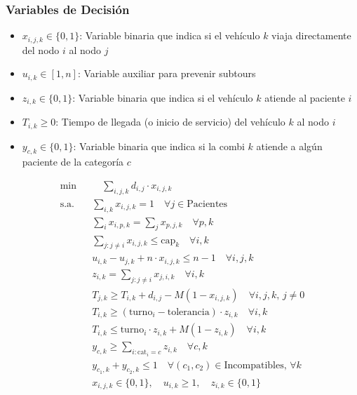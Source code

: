 \documentclass[12pt]{article}
\begin{document}
\subsubsection*{Variables de Decisión}

\begin{itemize}
    \item $x_{i,j,k} \in \{0,1\}$: Variable binaria que indica si el vehículo $k$ viaja directamente del nodo $i$ al nodo $j$
    \item $u_{i,k} \in [1,n]$: Variable auxiliar para prevenir subtours
    \item $z_{i,k} \in \{0,1\}$: Variable binaria que indica si el vehículo $k$ atiende al paciente $i$
    \item $T_{i,k} \geq 0$: Tiempo de llegada (o inicio de servicio) del vehículo $k$ al nodo $i$
    \item $y_{c,k} \in \{0,1\}$: Variable binaria que indica si la combi $k$ atiende a algún paciente de la categoría $c$
\end{itemize}

\begin{align*}
  \min & \quad \sum_{i,j,k} d_{i,j} \cdot x_{i,j,k} \\
  \text{s.a.} \quad
    & \sum_{i,k} x_{i,j,k} = 1 \quad \forall j \in \text{Pacientes} \\
    & \sum_{i} x_{i,p,k} = \sum_{j} x_{p,j,k} \quad \forall p, k \\
    & \sum_{j: j \ne i} x_{i,j,k} \leq \text{cap}_k \quad \forall i,k \\
    & u_{i,k} - u_{j,k} + n \cdot x_{i,j,k} \leq n - 1 \quad \forall i,j,k \\
    & z_{i,k} = \sum_{j: j \ne i} x_{j,i,k} \quad \forall i,k \\
    & T_{j,k} \geq T_{i,k} + d_{i,j} - M(1 - x_{i,j,k}) \quad \forall i,j,k, \, j \ne 0 \\
    & T_{i,k} \geq (\text{turno}_i - \text{tolerancia}) \cdot z_{i,k} \quad \forall i,k \\
    & T_{i,k} \leq \text{turno}_i \cdot z_{i,k} + M(1 - z_{i,k}) \quad \forall i,k \\
    & y_{c,k} \geq \sum_{i: \text{cat}_i = c} z_{i,k} \quad \forall c,k \\
    & y_{c_1,k} + y_{c_2,k} \leq 1 \quad \forall (c_1,c_2) \in \text{Incompatibles}, \, \forall k \\
    & x_{i,j,k} \in \{0,1\}, \quad u_{i,k} \geq 1, \quad z_{i,k} \in \{0,1\}
\end{align*}
\end{document}
